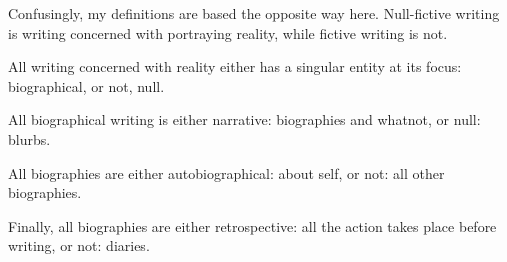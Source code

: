 \documentclass[12pt]{article}[titlepage]
\newcommand{\1}{\={a}}
\newcommand{\2}{\={e}}
\newcommand{\3}{\={\i}}
\newcommand{\4}{\=o}
\newcommand{\5}{\=u}
\newcommand{\6}{\={A}}
\renewcommand{\,}{\textsuperscript{,}}
\begin{document}
Confusingly, my definitions are based the opposite way here.
Null-fictive writing is writing concerned with portraying reality, while fictive writing is not.

All writing concerned with reality either has a singular entity at its focus: biographical, or not, null.

All biographical writing is either narrative: biographies and whatnot, or null: blurbs.

All biographies are either autobiographical: about self, or not: all other biographies.

Finally, all biographies are either retrospective: all the action takes place before writing, or not: diaries.
\end{document}

